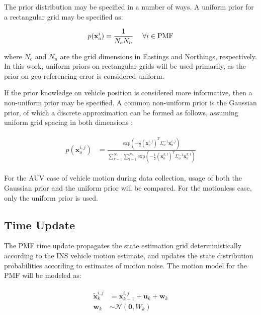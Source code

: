 The prior distribution may be specified in a number of ways.
A uniform prior for a rectangular grid may be specified as:

\begin{equation}
p(\mathbf{x}_o^{i}) = \frac{1}{N_e N_n} \hspace{3ex} \forall i \in \text{PMF}
\label{eq:uniformPrior}
\end{equation}

\noindent where $N_e$ and $N_n$ are the grid dimensions in Eastings and Northings, respectively. In this work, uniform priors on rectangular grids will be used primarily, as the prior on geo-referencing error is considered uniform.

If the prior knowledge on vehicle position is considered more informative, then a non-uniform prior may be specified.  A common non-uniform prior is the Gaussian prior, of which a discrete approximation can be formed as follows, assuming uniform grid spacing in both dimensions :

\begin{align}
\begin{split}
p(\mathbf{x}_o^{i,j}) &= \frac {\text{exp}(-\frac{1}{2}(\mathbf{x}_o^{i,j})^{T}\Sigma_o^{-1}\mathbf{x}_o^{i,j})}{\sum_{k=1}^{N_e} \sum_{l=1}^{N_n} \text{exp}(-\frac{1}{2}(\mathbf{x}_o^{k,l})^{T}\Sigma_o^{-1}\mathbf{x}_o^{k,l})}
\end{split}
\label{eq:nonuniformPrior}
\end{align}

For the AUV case of vehicle motion during data collection, usage of both the Gaussian prior and the uniform prior will be compared.  For the motionless case, only the uniform prior is used.

\subsection{Time Update}
\label{framework.PMF.Time}

The PMF time update propagates the state estimation grid deterministically according to the INS vehicle motion estimate, and updates the state distribution probabilities according to estimates of motion noise.
The motion model for the PMF will be modeled as:

\begin{align}
\begin{split}
\tilde{\mathbf{x}}_k^{i,j} &= \mathbf{x}_{k-1}^{i,j} + \mathbf{u}_k + \mathbf{w}_k \\
\mathbf{w}_k &\sim \mathcal{N}(\mathbf{0}, W_k) 
\end{split}
\end{align}

